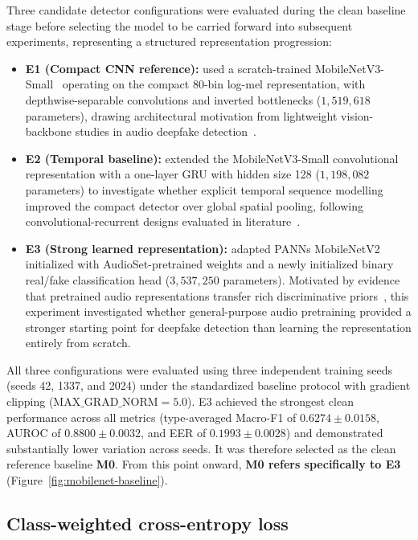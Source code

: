 Three candidate detector configurations were evaluated during the clean baseline stage before selecting the model to be carried forward into subsequent experiments, representing a structured representation progression:
\begin{itemize}
  \item \textbf{E1 (Compact CNN reference):} used a scratch-trained MobileNetV3-Small~\cite{howard2019mobilenetv3} operating on the compact 80-bin log-mel representation, with depthwise-separable convolutions and inverted bottlenecks ($1{,}519{,}618$ parameters), drawing architectural motivation from lightweight vision-backbone studies in audio deepfake detection~\cite{pham2024deepfake}.
  \item \textbf{E2 (Temporal baseline):} extended the MobileNetV3-Small convolutional representation with a one-layer GRU with hidden size 128 ($1{,}198{,}082$ parameters) to investigate whether explicit temporal sequence modelling improved the compact detector over global spatial pooling, following convolutional-recurrent designs evaluated in literature~\cite{pham2024deepfake}.
  \item \textbf{E3 (Strong learned representation):} adapted PANNs MobileNetV2~\cite{kong2020panns} initialized with AudioSet-pretrained weights and a newly initialized binary real/fake classification head ($3{,}537{,}250$ parameters). Motivated by evidence that pretrained audio representations transfer rich discriminative priors~\cite{combei2024wavlm,kong2020panns}, this experiment investigated whether general-purpose audio pretraining provided a stronger starting point for deepfake detection than learning the representation entirely from scratch.
\end{itemize}

All three configurations were evaluated using three independent training seeds (seeds 42, 1337, and 2024) under the standardized baseline protocol with gradient clipping ($\text{MAX\_GRAD\_NORM}=5.0$). E3 achieved the strongest clean performance across all metrics (type-averaged Macro-F1 of $0.6274 \pm 0.0158$, AUROC of $0.8800 \pm 0.0032$, and EER of $0.1993 \pm 0.0028$) and demonstrated substantially lower variation across seeds. It was therefore selected as the clean reference baseline \textbf{M0}. From this point onward, \textbf{M0 refers specifically to E3} (Figure~\ref{fig:mobilenet-baseline}).



\subsection{Class-weighted cross-entropy loss}

